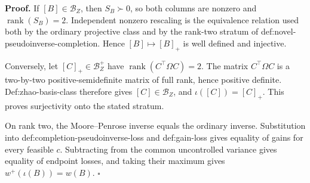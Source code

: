 \textbf{Proof.}
If \([B]\in\mathcal B_Z\), then \(S_B\succ0\), so both columns are nonzero and \(\operatorname{rank}(S_B)=2\).  Independent nonzero rescaling is the equivalence relation used both by the ordinary projective class and by the rank-two stratum of def:novel-pseudoinverse-completion.  Hence \([B]\mapsto[B]_+\) is well defined and injective.

Conversely, let \([C]_+\in\mathcal B_Z^+\) have \(\operatorname{rank}(C^{\top}\Omega C)=2\).  The matrix \(C^{\top}\Omega C\) is a two-by-two positive-semidefinite matrix of full rank, hence positive definite.  Def:zhao-basis-class therefore gives \([C]\in\mathcal B_Z\), and \(\iota([C])=[C]_+\).  This proves surjectivity onto the stated stratum.

On rank two, the Moore--Penrose inverse equals the ordinary inverse.  Substitution into def:completion-pseudoinverse-loss and def:gain-loss gives equality of gains for every feasible \(c\).  Subtracting from the common uncontrolled variance gives equality of endpoint losses, and taking their maximum gives \(w^+(\iota(B))=w(B)\). \(\square\)